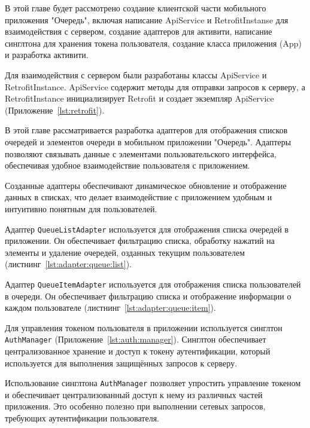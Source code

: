 

В этой главе будет рассмотрено создание клиентской части мобильного
приложения "Очередь", включая написание ApiService и RetrofitInstanse
для взаимодействия с сервером, создание адаптеров для активити,
написание синглтона для хранения токена пользователя,
создание класса приложения (App) и разработка активити.


Для взаимодействия с сервером были разработаны
классы ApiService и RetrofitInstance.
ApiService содержит методы для отправки запросов к серверу,
а RetrofitInstance инициализирует Retrofit и создает экземпляр ApiService
(Приложение~\ref{lst:retrofit}).


В этой главе рассматривается разработка адаптеров для отображения списков
очередей и элементов очереди в мобильном приложении "Очередь".
Адаптеры позволяют связывать данные с элементами пользовательского интерфейса,
обеспечивая удобное взаимодействие пользователя с приложением.\par
Созданные адаптеры обеспечивают динамическое обновление и отображение данных
в списках, что делает взаимодействие с приложением удобным
и интуитивно понятным для пользователей.

Адаптер \texttt{QueueListAdapter} используется
для отображения списка очередей в приложении.
Он обеспечивает фильтрацию списка, обработку нажатий на элементы
и удаление очередей, озданных текущим пользователем
(листнинг~\ref{lst:adapter:queue:list}).

Адаптер \texttt{QueueItemAdapter} используется
для отображения списка пользователей в очереди.
Он обеспечивает фильтрацию списка и отображение информации
о каждом пользователе (листнинг~\ref{lst:adapter:queue:item}).


Для управления токеном пользователя
в приложении используется синглтон \texttt{AuthManager}
(Приложение~\ref{lst:auth:manager}).
Синглтон обеспечивает централизованное хранение
и доступ к токену аутентификации,
который используется для выполнения защищённых запросов к серверу.\par
Использование синглтона \texttt{AuthManager}
позволяет упростить управление токеном
и обеспечивает централизованный доступ к нему из различных частей приложения.
Это особенно полезно при выполнении сетевых запросов,
требующих аутентификации пользователя.

